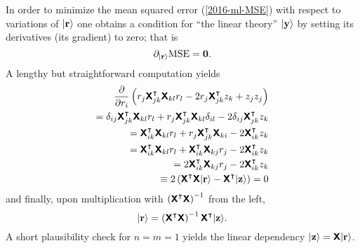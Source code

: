 {\begin{enumerate}
In order to minimize the mean squared error (\ref{2016-ml-MSE}) with respect to variations of $\vert {\bf r} \rangle$
one obtains a condition for ``the linear theory'' $\vert {\bf y} \rangle$
by setting its derivatives (its gradient) to zero; that is
\begin{equation}
\partial_{ \vert {\bf r} \rangle } \text{MSE}
=
{\bf 0}.
\label{2016-ml-MSE-min}
\end{equation}
A lengthy but straightforward computation yields
\begin{equation}
\begin{split}
\frac{\partial }{\partial r_i}
\left(
r_j  \textsf{\textbf{X}}^\intercal _{jk} \textsf{\textbf{X}}_{kl} r_l -2 r_j \textsf{\textbf{X}}^\intercal _{jk}z_k + z_jz_j
\right)
\\
=
\delta_{ij}  \textsf{\textbf{X}}^\intercal _{jk} \textsf{\textbf{X}}_{kl} r_l
+
r_j \textsf{\textbf{X}}^\intercal _{jk} \textsf{\textbf{X}}_{kl}  \delta_{il}
-2 \delta_{ij} \textsf{\textbf{X}}^\intercal _{jk}z_k
\\
=
\textsf{\textbf{X}}^\intercal _{ik} \textsf{\textbf{X}}_{kl} r_l
+
r_j \textsf{\textbf{X}}^\intercal _{jk} \textsf{\textbf{X}}_{ki}
-2 \textsf{\textbf{X}}^\intercal _{ik}z_k
\\
=
\textsf{\textbf{X}}^\intercal _{ik} \textsf{\textbf{X}}_{kl} r_l
+
\textsf{\textbf{X}}^\intercal _{ik} \textsf{\textbf{X}}_{kj} r_j
-2 \textsf{\textbf{X}}^\intercal _{ik}z_k
\\
=
2 \textsf{\textbf{X}}^\intercal _{ik} \textsf{\textbf{X}}_{kj} r_j
-2 \textsf{\textbf{X}}^\intercal _{ik} z_k
\\
\equiv
2\left( \textsf{\textbf{X}}^\intercal  \textsf{\textbf{X}} \vert {\bf r} \rangle - \textsf{\textbf{X}}^\intercal    \vert {\bf z} \rangle
\right)
=0
\end{split}
\label{2016-ml-MSE-min-res-der}
\end{equation}
and finally, upon multiplication with
$ \left( \textsf{\textbf{X}}^\intercal  \textsf{\textbf{X}}  \right)^{-1}$ from the left,
\begin{equation}
\vert {\bf r} \rangle
=  \left( \textsf{\textbf{X}}^\intercal  \textsf{\textbf{X}} \right)^{-1}
\textsf{\textbf{X}}^\intercal  \vert {\bf z} \rangle
.
\label{2016-ml-MSE-min-res}
\end{equation}
A short plausibility check for $n=m=1$ yields the linear dependency
$\vert {\bf z} \rangle  =  \textsf{\textbf{X}} \vert {\bf r} \rangle$.




\end{enumerate}

\eexample
}

